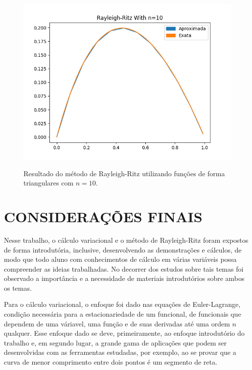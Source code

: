\documentclass[
	12pt,				%
	openright,			%
    twoside,			%
	a4paper,			%
	chapter=TITLE,		%
	english,			%
	french,				%
	spanish,			%
	brazil				%
	]{abntex2}
\numberwithin{lema}{chapter}
\numberwithin{teorema}{chapter}
\numberwithin{definicao}{chapter}
\numberwithin{exemplo}{chapter}
\numberwithin{figure}{chapter}
\begin{document}
\begin{figure}[h]
	\caption{Resultado do método de Rayleigh-Ritz utilizando funções de forma triangulares com $n=10$.}
	\centering
	\includegraphics[scale=0.65]{../figuras/code/code_plot_mrr_triangulate_n10.png}
	\label{fig:code_plot_mrr_triangulate_n10}
\end{figure}

\chapter*{CONSIDERAÇÕES FINAIS}

Nesse trabalho, o cálculo variacional e o método de Rayleigh-Ritz foram expostos de forma introdutória, inclusive, desenvolvendo as demonstrações e cálculos, de modo que todo aluno com conhecimentos de cálculo em várias variáveis possa compreender as ideias trabalhadas. No decorrer dos estudos sobre tais temas foi observado a importância e a necessidade de materiais introdutórios sobre ambos os temas.

Para o cálculo variacional, o enfoque foi dado nas equações de Euler-Lagrange, condição necessária para a estacionariedade de um funcional, de funcionais que dependem de uma váriavel, uma função e de suas derivadas até uma ordem $n$ qualquer. Esse enfoque dado se deve, primeiramente, ao enfoque introdutório do trabalho e, em segundo lugar, a grande gama de aplicações que podem ser desenvolvidas com as ferramentas estudadas, por exemplo, ao se provar que a curva de menor comprimento entre dois pontos é um segmento de reta.
\end{document}
